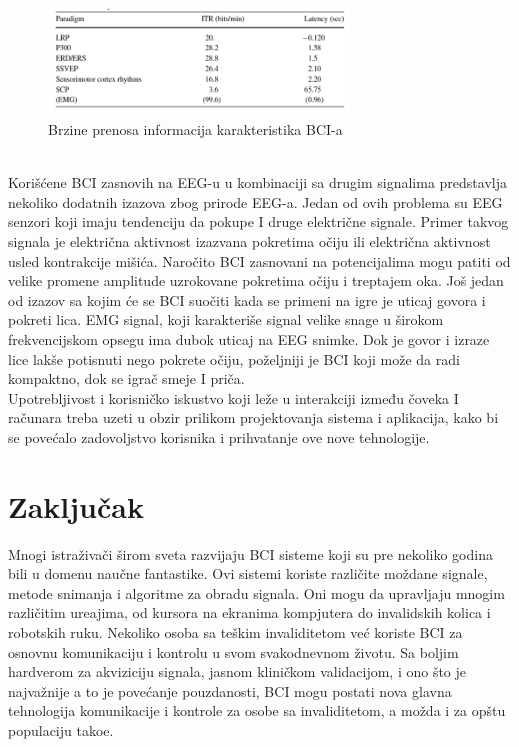 \documentclass[conference]{IEEEtran}
\begin{document}
\begin{figure}[htp]
\centerline{\includegraphics[width=8cm, height=3cm]{brzine.png}}
\caption{Brzine prenosa informacija karakteristika BCI-a}
\label{Slika}
\end{figure}\\
Korišćene BCI zasnovih na EEG-u u kombinaciji sa drugim signalima predstavlja nekoliko dodatnih izazova zbog prirode EEG-a. Jedan od ovih problema su EEG senzori koji imaju tendenciju da pokupe I druge električne signale. Primer takvog signala je električna aktivnost izazvana pokretima očiju ili električna aktivnost usled kontrakcije mišića. Naročito BCI zasnovani na potencijalima mogu patiti od velike promene amplitude uzrokovane pokretima očiju i treptajem oka. Još jedan od izazov sa kojim će se BCI suočiti kada se primeni na igre je uticaj govora i pokreti lica. EMG signal, koji karakteriše signal velike snage u širokom frekvencijskom opsegu ima dubok uticaj na EEG snimke. Dok je govor i izraze lice lakše potisnuti nego pokrete očiju, poželjniji je BCI koji može da radi kompaktno, dok se igrač smeje I priča. \\
Upotrebljivost i korisničko iskustvo koji leže u interakciji između čoveka I računara treba uzeti u obzir prilikom projektovanja sistema i aplikacija, kako bi se povećalo zadovoljstvo korisnika i prihvatanje ove nove tehnologije. 
\section{Zaključak}
Mnogi istraživači  širom sveta razvijaju BCI sisteme koji su pre nekoliko godina bili u domenu naučne fantastike. Ovi sistemi koriste različite moždane signale, metode snimanja i algoritme za obradu signala. Oni mogu da upravljaju mnogim različitim ure\dj ajima, od kursora na ekranima kompjutera do invalidskih kolica i robotskih ruku. Nekoliko osoba sa teškim invaliditetom već koriste BCI za osnovnu komunikaciju i kontrolu u svom svakodnevnom životu. Sa boljim hardverom za akviziciju signala, jasnom kliničkom validacijom, i ono što je najvažnije a to je povećanje pouzdanosti, BCI mogu postati nova glavna tehnologija komunikacije i kontrole za osobe sa invaliditetom, a možda i za opštu populaciju tako\dj e.

\nocite{*}


\end{document}
